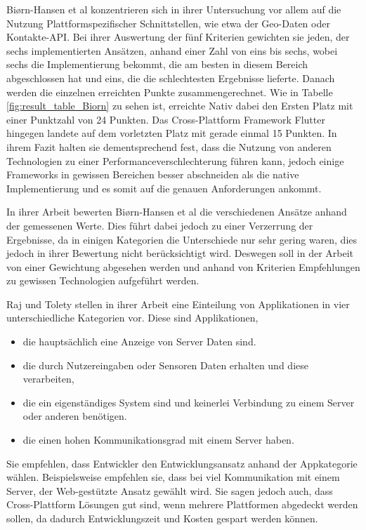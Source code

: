 Biørn-Hansen et al \cite{BirnHansen.2020} konzentrieren sich in ihrer Untersuchung vor allem auf die Nutzung Plattformspezifischer Schnittstellen, wie etwa der Geo-Daten oder Kontakte-API. Bei ihrer Auswertung der fünf Kriterien gewichten sie jeden, der sechs implementierten Ansätzen, anhand einer Zahl von eins bis sechs, wobei sechs die Implementierung bekommt, die am besten in diesem Bereich abgeschlossen hat und eins, die die schlechtesten Ergebnisse lieferte. Danach werden die einzelnen erreichten Punkte zusammengerechnet. Wie in Tabelle \ref{fig:result_table_Biorn} zu sehen ist, erreichte Nativ dabei den Ersten Platz mit einer Punktzahl von 24 Punkten. Das Cross-Plattform Framework Flutter hingegen landete auf dem vorletzten Platz mit gerade einmal 15 Punkten. In ihrem Fazit halten sie dementsprechend fest, dass die Nutzung von anderen Technologien zu einer Performanceverschlechterung führen kann, jedoch einige Frameworks in gewissen Bereichen besser abschneiden als die native Implementierung und es somit auf die genauen Anforderungen ankommt.

In ihrer Arbeit bewerten Biørn-Hansen et al die verschiedenen Ansätze anhand der gemessenen Werte. Dies führt dabei jedoch zu einer Verzerrung der Ergebnisse, da in einigen Kategorien die Unterschiede nur sehr gering waren, dies jedoch in ihrer Bewertung nicht berücksichtigt wird. Deswegen soll in der Arbeit von einer Gewichtung abgesehen werden und anhand von Kriterien Empfehlungen zu gewissen Technologien aufgeführt werden.

Raj und Tolety \cite{IEEE_Rahul_Seshu} stellen in ihrer Arbeit eine Einteilung von Applikationen in vier unterschiedliche Kategorien vor. Diese sind Applikationen,
\begin{itemize}
    \item die hauptsächlich eine Anzeige von Server Daten sind.
    \item die durch Nutzereingaben oder Sensoren Daten erhalten und diese verarbeiten,
    \item die ein eigenständiges System sind und keinerlei Verbindung zu einem Server oder anderen benötigen.
    \item die einen hohen Kommunikationsgrad mit einem Server haben.
\end{itemize}
Sie empfehlen, dass Entwickler den Entwicklungsansatz anhand der Appkategorie wählen. Beispielsweise empfehlen sie, dass bei viel Kommunikation mit einem Server, der Web-gestützte Ansatz gewählt wird. Sie sagen jedoch auch, dass Cross-Plattform Lösungen gut sind, wenn mehrere Plattformen abgedeckt werden sollen, da dadurch Entwicklungszeit und Kosten gespart werden können.

